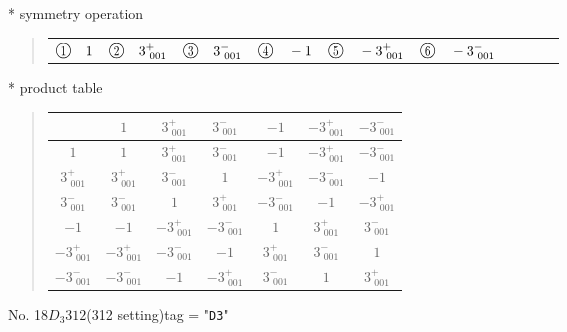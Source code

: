 \documentclass[fleqn,10pt,landscape]{jsarticle}
\begin{document}
* symmetry operation
\begin{quote}
\begin{tabular}{llllllllll}
$ {\ooalign{\hfil\resizebox{.8\width}{\height}{1}\hfil\crcr\raise.1ex\hbox{\large$\bigcirc$}}}\quad 1 $ & $ {\ooalign{\hfil\resizebox{.8\width}{\height}{2}\hfil\crcr\raise.1ex\hbox{\large$\bigcirc$}}}\quad 3^{+}_{\,\,001} $ & $ {\ooalign{\hfil\resizebox{.8\width}{\height}{3}\hfil\crcr\raise.1ex\hbox{\large$\bigcirc$}}}\quad 3^{-}_{\,\,001} $ & $ {\ooalign{\hfil\resizebox{.8\width}{\height}{4}\hfil\crcr\raise.1ex\hbox{\large$\bigcirc$}}}\quad -1 $ & $ {\ooalign{\hfil\resizebox{.8\width}{\height}{5}\hfil\crcr\raise.1ex\hbox{\large$\bigcirc$}}}\quad -3^{+}_{\,\,001} $ & $ {\ooalign{\hfil\resizebox{.8\width}{\height}{6}\hfil\crcr\raise.1ex\hbox{\large$\bigcirc$}}}\quad -3^{-}_{\,\,001} $
\end{tabular}
\end{quote}

* product table
\begin{quote}
\begin{tabular}{ccccccc} \hline \hline
 & $ 1 $ & $ 3^{+}_{\,\,001} $ & $ 3^{-}_{\,\,001} $ & $ -1 $ & $ -3^{+}_{\,\,001} $ & $ -3^{-}_{\,\,001} $ \\ \hline
$ 1 $ & $ 1 $ & $ 3^{+}_{\,\,001} $ & $ 3^{-}_{\,\,001} $ & $ -1 $ & $ -3^{+}_{\,\,001} $ & $ -3^{-}_{\,\,001} $ \\
$ 3^{+}_{\,\,001} $ & $ 3^{+}_{\,\,001} $ & $ 3^{-}_{\,\,001} $ & $ 1 $ & $ -3^{+}_{\,\,001} $ & $ -3^{-}_{\,\,001} $ & $ -1 $ \\
$ 3^{-}_{\,\,001} $ & $ 3^{-}_{\,\,001} $ & $ 1 $ & $ 3^{+}_{\,\,001} $ & $ -3^{-}_{\,\,001} $ & $ -1 $ & $ -3^{+}_{\,\,001} $ \\
$ -1 $ & $ -1 $ & $ -3^{+}_{\,\,001} $ & $ -3^{-}_{\,\,001} $ & $ 1 $ & $ 3^{+}_{\,\,001} $ & $ 3^{-}_{\,\,001} $ \\
$ -3^{+}_{\,\,001} $ & $ -3^{+}_{\,\,001} $ & $ -3^{-}_{\,\,001} $ & $ -1 $ & $ 3^{+}_{\,\,001} $ & $ 3^{-}_{\,\,001} $ & $ 1 $ \\
$ -3^{-}_{\,\,001} $ & $ -3^{-}_{\,\,001} $ & $ -1 $ & $ -3^{+}_{\,\,001} $ & $ 3^{-}_{\,\,001} $ & $ 1 $ & $ 3^{+}_{\,\,001} $ \\
 \hline \hline
\end{tabular}
\end{quote}

\newpage

No. 18\quad$D_{3}$\quad$312$\quad(312 setting)\quad[ trigonal ]
tag = "{\tt D3}"
\end{document}
